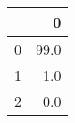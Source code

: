 \begin{tabular}{lr}
\toprule
{} &     0 \\
\midrule
0 &  99.0 \\
1 &   1.0 \\
2 &   0.0 \\
\bottomrule
\end{tabular}
